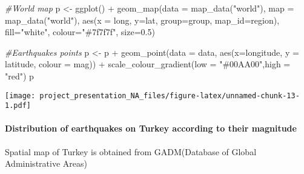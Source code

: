 \documentclass[
]{article}
\newenvironment{Shaded}{\begin{snugshade}}{\end{snugshade}}
\newcommand{\AttributeTok}[1]{\textcolor[rgb]{0.77,0.63,0.00}{#1}}
\newcommand{\CommentTok}[1]{\textcolor[rgb]{0.56,0.35,0.01}{\textit{#1}}}
\newcommand{\FloatTok}[1]{\textcolor[rgb]{0.00,0.00,0.81}{#1}}
\newcommand{\FunctionTok}[1]{\textcolor[rgb]{0.00,0.00,0.00}{#1}}
\newcommand{\NormalTok}[1]{#1}
\newcommand{\OtherTok}[1]{\textcolor[rgb]{0.56,0.35,0.01}{#1}}
\newcommand{\SpecialCharTok}[1]{\textcolor[rgb]{0.00,0.00,0.00}{#1}}
\newcommand{\StringTok}[1]{\textcolor[rgb]{0.31,0.60,0.02}{#1}}
\begin{document}
\begin{Shaded}
\begin{Highlighting}[]
\CommentTok{\#World map}
\NormalTok{p }\OtherTok{\textless{}{-}} \FunctionTok{ggplot}\NormalTok{() }\SpecialCharTok{+} \FunctionTok{geom\_map}\NormalTok{(}\AttributeTok{data =} \FunctionTok{map\_data}\NormalTok{(}\StringTok{"world"}\NormalTok{), }\AttributeTok{map =} \FunctionTok{map\_data}\NormalTok{(}\StringTok{"world"}\NormalTok{), }\FunctionTok{aes}\NormalTok{(}\AttributeTok{x =}\NormalTok{ long, }\AttributeTok{y=}\NormalTok{lat, }\AttributeTok{group=}\NormalTok{group, }\AttributeTok{map\_id=}\NormalTok{region), }\AttributeTok{fill=}\StringTok{"white"}\NormalTok{, }\AttributeTok{colour=}\StringTok{"\#7f7f7f"}\NormalTok{, }\AttributeTok{size=}\FloatTok{0.5}\NormalTok{)}

\CommentTok{\#Earthquakes points}
\NormalTok{p }\OtherTok{\textless{}{-}}\NormalTok{ p }\SpecialCharTok{+} \FunctionTok{geom\_point}\NormalTok{(}\AttributeTok{data =}\NormalTok{ data, }\FunctionTok{aes}\NormalTok{(}\AttributeTok{x=}\NormalTok{longitude, }\AttributeTok{y =}\NormalTok{ latitude, }\AttributeTok{colour =}\NormalTok{ mag)) }\SpecialCharTok{+} \FunctionTok{scale\_colour\_gradient}\NormalTok{(}\AttributeTok{low =} \StringTok{"\#00AA00"}\NormalTok{,}\AttributeTok{high =} \StringTok{"red"}\NormalTok{)}
\NormalTok{p}
\end{Highlighting}
\end{Shaded}

\texttt{[image: project\_presentation\_NA\_files/figure-latex/unnamed-chunk-13-1.pdf]}

\hypertarget{distribution-of-earthquakes-on-turkey-according-to-their-magnitude}{%
\paragraph{Distribution of earthquakes on Turkey according to their
magnitude}\label{distribution-of-earthquakes-on-turkey-according-to-their-magnitude}}

Spatial map of Turkey is obtained from GADM(Database of Global
Administrative Areas)
\end{document}
